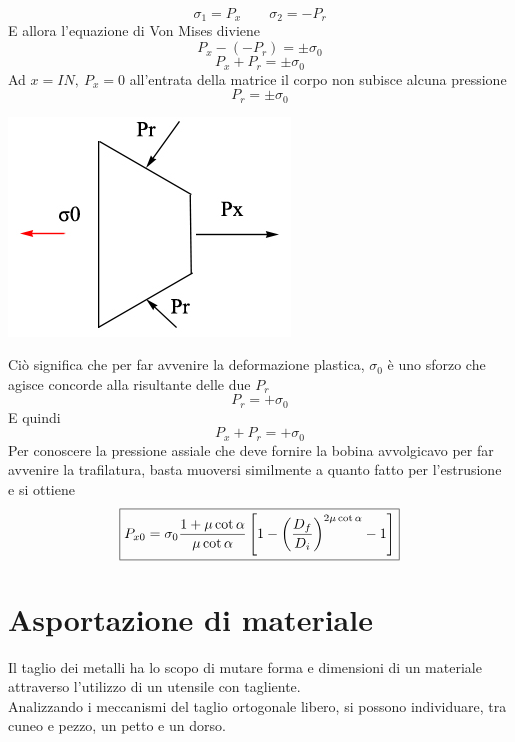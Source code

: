 \documentclass[a4paper, 15pt]{article}
\begin{document}
	\[\sigma_1 = P_x\qquad\sigma_2 = -P_r\]
	E allora l'equazione di Von Mises diviene
	\[P_x-(-P_r) = \pm\sigma_0\]
	\[P_x+P_r = \pm\sigma_0\]
	Ad $x = IN, ~ P_x=0$ all'entrata della matrice il corpo non subisce alcuna pressione
	\[P_r = \pm\sigma_0\]
	\begin{center}
		\includegraphics[width=0.5\linewidth]{figures/def12.2}
	\end{center}
	Ciò significa che per far avvenire la deformazione plastica, $\sigma_0$ è uno sforzo che agisce concorde alla risultante delle due $P_r$
	\[P_r = +\sigma_0\]
	E quindi 
	\begin{equation}\label{eq:slatr}
		\boxed{P_x+P_r = +\sigma_0}
	\end{equation}
	Per conoscere la pressione assiale che deve fornire la bobina avvolgicavo per far avvenire la trafilatura, basta muoversi similmente a quanto fatto per l'estrusione e si ottiene
	\begin{equation}\label{eq:10}
		\boxed{P_{x0} = \sigma_0\dfrac{1+\mu\cot\alpha}{\mu\cot\alpha}\left[1-\left(D_f\over D_i\right)^{2\mu\cot\alpha}-1\right]}
	\end{equation}
	\newpage
	\part{Asportazione di materiale}
	Il taglio dei metalli ha lo scopo di mutare forma e dimensioni di un materiale attraverso l'utilizzo di un utensile con tagliente. \\
	
	Analizzando i meccanismi del taglio ortogonale libero, si possono individuare, tra cuneo e pezzo, un petto e un dorso.
	
\end{document}
